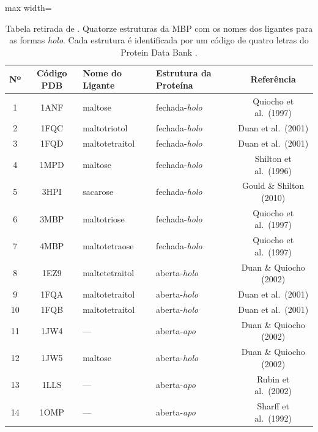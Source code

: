 \documentclass[12pt, a4paper]{article}
\begin{document}
\begin{table}[H]
    \centering
    \captionsetup{margin=1cm}

    \begin{adjustbox}{max width=\textwidth}
        \begin{tabular}{@{}ccllc@{}}
            \toprule
            \textbf{Nº} & \textbf{Código PDB} & \textbf{Nome do Ligante} & \textbf{Estrutura da Proteína} & \textbf{Referência} \\
            \midrule
            1  & 1ANF & maltose        & fechada-\textit{holo} & Quiocho et al.\ (1997) \\
            2  & 1FQC & maltotriotol   & fechada-\textit{holo} & Duan et al.\ (2001)   \\
            3  & 1FQD & maltotetraitol & fechada-\textit{holo} & Duan et al.\ (2001)   \\
            4  & 1MPD & maltose        & fechada-\textit{holo} & Shilton et al.\ (1996) \\
            5  & 3HPI & sacarose       & fechada-\textit{holo} & Gould \& Shilton (2010) \\
            6  & 3MBP & maltotriose    & fechada-\textit{holo} & Quiocho et al.\ (1997) \\
            7  & 4MBP & maltotetraose  & fechada-\textit{holo} & Quiocho et al.\ (1997) \\
            8  & 1EZ9 & maltetetraitol & aberta-\textit{holo}  & Duan \& Quiocho (2002) \\
            9  & 1FQA & maltotetraitol & aberta-\textit{holo}  & Duan et al.\ (2001)   \\
            10 & 1FQB & maltotetraitol & aberta-\textit{holo}  & Duan et al.\ (2001)   \\
            11 & 1JW4 & ---            & aberta-\textit{apo}   & Duan \& Quiocho (2002) \\
            12 & 1JW5 & maltose        & aberta-\textit{holo}  & Duan \& Quiocho (2002) \\
            13 & 1LLS & ---            & aberta-\textit{apo}   & Rubin et al.\ (2002)  \\
            14 & 1OMP & ---            & aberta-\textit{apo}   & Sharff et al.\ (1992) \\
            \bottomrule
        \end{tabular}
    \end{adjustbox}
    \caption{Tabela retirada de \cite{kovacev2016}. Quatorze estruturas da MBP com os nomes dos ligantes para as formas \textit{holo}. Cada estrutura é identificada por um código de quatro letras do Protein Data Bank \cite{Bernstein1977}.}
    \label{tab:estruturas}
\end{table}
\end{document}
